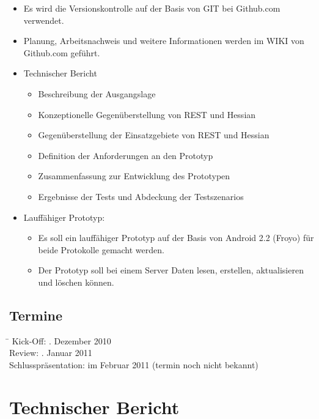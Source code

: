 \documentclass[listof=totocnumbered, bibliography=totocnumbered]{scrreprt}
\begin{document}
  \begin{itemize}
    \item Es wird die Versionskontrolle auf der Basis von GIT bei
          Github.com verwendet.
    \item Planung, Arbeitsnachweis und weitere Informationen werden im WIKI
          von Github.com geführt.
    \item Technischer Bericht
    \begin{itemize}
      \item Beschreibung der Ausgangslage
      \item Konzeptionelle Gegenüberstellung von \ac{REST} und Hessian
      \item Gegenüberstellung der Einsatzgebiete von \ac{REST} und Hessian
      \item Definition der Anforderungen an den Prototyp 
      \item Zusammenfassung zur Entwicklung des Prototypen
      \item Ergebnisse der Tests und Abdeckung der Testszenarios
    \end{itemize}
    \item Lauffähiger Prototyp:
    \begin{itemize}
      \item Es soll ein lauffähiger Prototyp auf der Basis von
            Android 2.2 (Froyo) für beide Protokolle gemacht werden.
      \item Der Prototyp soll bei einem Server Daten lesen, erstellen,
            aktualisieren und löschen können.
    \end{itemize}
  \end{itemize}
  
  \section{Termine}
  
  \begin{tabbing}
    \hspace*{4cm}\= \kill
    Kick-Off:               . Dezember 2010 \\
    Review:                 . Januar 2011 \\
    Schlusspräsentation:    \> im Februar 2011 (termin noch nicht bekannt)\\
  \end{tabbing}
  
  \chapter{Technischer Bericht}
  
\end{document}

